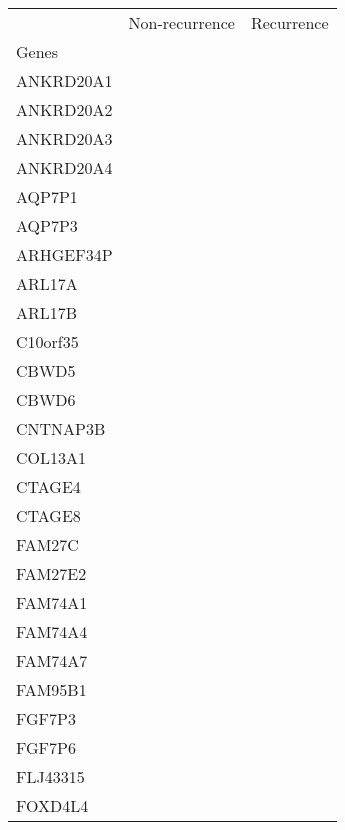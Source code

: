 \begin{tabular}{lcc}
\toprule
{} & Non-recurrence & Recurrence \\
Genes              &                &            \\
\midrule
ANKRD20A1          &                &            \\
ANKRD20A2          &                &            \\
ANKRD20A3          &                &            \\
ANKRD20A4          &                &            \\
AQP7P1             &                &            \\
AQP7P3             &                &            \\
ARHGEF34P          &                &            \\
ARL17A             &                &            \\
ARL17B             &                &            \\
C10orf35           &                &            \\
CBWD5              &                &            \\
CBWD6              &                &            \\
CNTNAP3B           &                &            \\
COL13A1            &                &            \\
CTAGE4             &                &            \\
CTAGE8             &                &            \\
FAM27C             &                &            \\
FAM27E2            &                &            \\
FAM74A1            &                &            \\
FAM74A4            &                &            \\
FAM74A7            &                &            \\
FAM95B1            &                &            \\
FGF7P3             &                &            \\
FGF7P6             &                &            \\
FLJ43315           &                &            \\
FOXD4L4            &                &            \\

\end{tabular}
